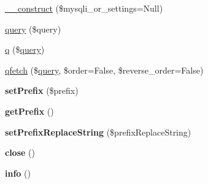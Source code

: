 \begin{DoxyCompactItemize}
\item 
\hyperlink{classBabab_1_1Simphplist_1_1DB_1_1MysqlHandler_ace2ba4301dbdbe8b3c9cfd3297816394}{\+\_\+\+\_\+construct} (\$mysqli\+\_\+or\+\_\+settings=Null)
\item 
\hyperlink{classBabab_1_1Simphplist_1_1DB_1_1MysqlHandler_af75512d0141b5f9256677ad5737b6505}{query} (\$query)
\item 
\hyperlink{classBabab_1_1Simphplist_1_1DB_1_1MysqlHandler_abfca7a1443ab42be5b4104a81f12530f}{q} (\$\hyperlink{classBabab_1_1Simphplist_1_1DB_1_1MysqlHandler_af75512d0141b5f9256677ad5737b6505}{query})
\item 
\hyperlink{classBabab_1_1Simphplist_1_1DB_1_1MysqlHandler_a4bc07f585cd897c60d4cb84040a3582c}{qfetch} (\$\hyperlink{classBabab_1_1Simphplist_1_1DB_1_1MysqlHandler_af75512d0141b5f9256677ad5737b6505}{query}, \$order=False, \$reverse\+\_\+order=False)
\item 
\hypertarget{classBabab_1_1Simphplist_1_1DB_1_1MysqlHandler_aa45de5f4f088dbb0c2d196ebb16a3a03}{{\bfseries set\+Prefix} (\$prefix)}\label{classBabab_1_1Simphplist_1_1DB_1_1MysqlHandler_aa45de5f4f088dbb0c2d196ebb16a3a03}

\item 
\hypertarget{classBabab_1_1Simphplist_1_1DB_1_1MysqlHandler_a81e4b91e84ce126150633a0a2e6e43f6}{{\bfseries get\+Prefix} ()}\label{classBabab_1_1Simphplist_1_1DB_1_1MysqlHandler_a81e4b91e84ce126150633a0a2e6e43f6}

\item 
\hypertarget{classBabab_1_1Simphplist_1_1DB_1_1MysqlHandler_a0cbfc05764cd89a6652c5c1e7fd872b9}{{\bfseries set\+Prefix\+Replace\+String} (\$prefix\+Replace\+String)}\label{classBabab_1_1Simphplist_1_1DB_1_1MysqlHandler_a0cbfc05764cd89a6652c5c1e7fd872b9}

\item 
\hypertarget{classBabab_1_1Simphplist_1_1DB_1_1MysqlHandler_a5e3abb0cd1ec78becae635de0eb349a1}{{\bfseries close} ()}\label{classBabab_1_1Simphplist_1_1DB_1_1MysqlHandler_a5e3abb0cd1ec78becae635de0eb349a1}

\item 
\hypertarget{classBabab_1_1Simphplist_1_1DB_1_1MysqlHandler_ab363ecda5a04efe240e32a4e4e3ddcf7}{{\bfseries info} ()}\label{classBabab_1_1Simphplist_1_1DB_1_1MysqlHandler_ab363ecda5a04efe240e32a4e4e3ddcf7}

\end{DoxyCompactItemize}


